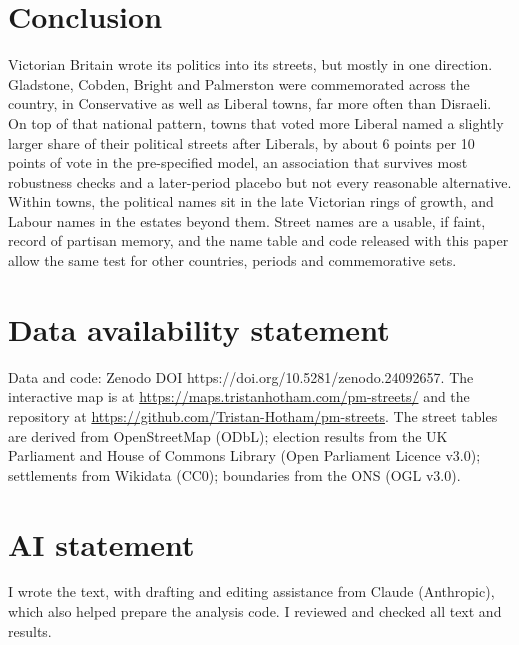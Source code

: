 \documentclass[11pt,a4paper]{article}
\begin{document}
\section{Conclusion}
Victorian Britain wrote its politics into its streets, but mostly in one direction. Gladstone, Cobden, Bright and Palmerston were commemorated across the country, in Conservative as well as Liberal towns, far more often than Disraeli. On top of that national pattern, towns that voted more Liberal named a slightly larger share of their political streets after Liberals, by about 6 points per 10 points of vote in the pre-specified model, an association that survives most robustness checks and a later-period placebo but not every reasonable alternative. Within towns, the political names sit in the late Victorian rings of growth, and Labour names in the estates beyond them. Street names are a usable, if faint, record of partisan memory, and the name table and code released with this paper allow the same test for other countries, periods and commemorative sets.

\section*{Data availability statement}
Data and code: Zenodo DOI https://doi.org/10.5281/zenodo.24092657. The interactive map is at \url{https://maps.tristanhotham.com/pm-streets/} and the repository at \url{https://github.com/Tristan-Hotham/pm-streets}. The street tables are derived from OpenStreetMap (ODbL); election results from the UK Parliament and House of Commons Library (Open Parliament Licence v3.0); settlements from Wikidata (CC0); boundaries from the ONS (OGL v3.0).

\section*{AI statement}
I wrote the text, with drafting and editing assistance from Claude (Anthropic), which also helped prepare the analysis code. I reviewed and checked all text and results.
\end{document}
